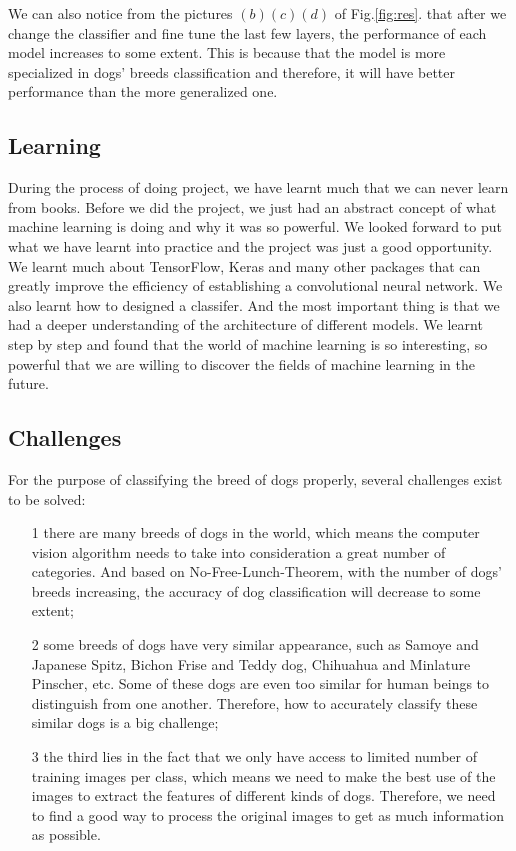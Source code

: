 \documentclass{article}
\begin{document}
We can also notice from the pictures $(b)(c)(d)$ of Fig.\ref{fig:res}. that after we change the classifier and fine tune the last few layers, the performance of each model increases to some extent. This is because that the model is more specialized in dogs' breeds classification and therefore, it will have better performance than the more generalized one. 
\subsection{Learning}
During the process of doing project, we have learnt much that we can never learn from books. Before we did the project, we just had an abstract concept of what machine learning is doing and why it was so powerful. We looked forward to put what we have learnt into practice and the project was just a good opportunity. We learnt much about TensorFlow, Keras and many other packages that can greatly improve the efficiency of establishing a convolutional neural network. We also learnt how to designed a classifer. And the most important thing is that we had a deeper understanding of the architecture of different models. We learnt step by step and found that the world of machine learning is so interesting, so powerful that we are willing to discover the fields of machine learning in the future.
\subsection{Challenges}
For the purpose of classifying the breed of dogs properly, several challenges exist to be solved: 
\begin{itemize}
	\item[1] there are many breeds of dogs in the world, which means the computer vision algorithm needs to take into consideration a great number of categories. And based on No-Free-Lunch-Theorem, with the number of dogs' breeds increasing, the accuracy of dog classification will decrease to some extent; 
	\item[2] some breeds of dogs have very similar appearance, such as Samoye and Japanese Spitz, Bichon Frise and Teddy dog, Chihuahua and Minlature Pinscher, etc. Some of these dogs are even too similar for human beings to distinguish from one another. Therefore, how to accurately classify these similar dogs is a big challenge; 
	\item[3] the third lies in the fact that we only have access to limited number of training images per class, which means we need to make the best use of the images to extract the features of different kinds of dogs. Therefore, we need to find a good way to process the original images to get as much information as possible. 
\end{itemize}
\end{document}
